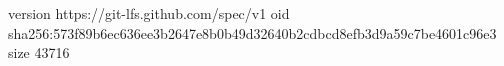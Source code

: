 version https://git-lfs.github.com/spec/v1
oid sha256:573f89b6ec636ee3b2647e8b0b49d32640b2cdbcd8efb3d9a59c7be4601c96e3
size 43716
